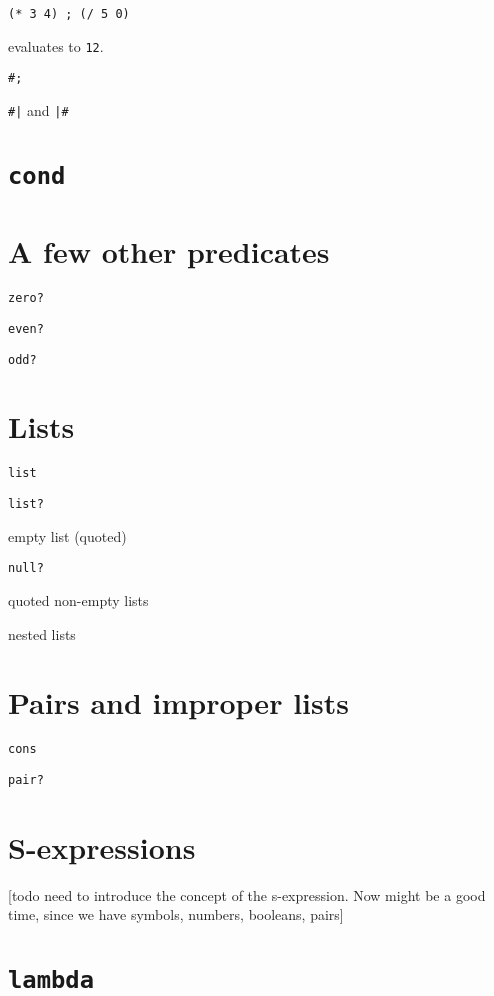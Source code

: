 \documentclass{book}
\begin{document}
\verb|(* 3 4) ; (/ 5 0)|

\noindent
evaluates to \verb|12|.

\verb|#;|

\texttt{\#|} and
\texttt{|\#}

\section{\texttt{cond}}

\section{A few other predicates}

\verb|zero?|

\verb|even?|

\verb|odd?|

\section{Lists}

\verb|list|

\verb|list?|

empty list (quoted)

\verb|null?|

quoted non-empty lists

nested lists




\section{Pairs and improper lists}

\verb|cons|

\verb|pair?|

\section{S-expressions}

[todo need to introduce the concept of the s-expression.  Now might be a good time, since we have symbols, numbers, booleans, pairs]

\section{\texttt{lambda}}
\end{document}
